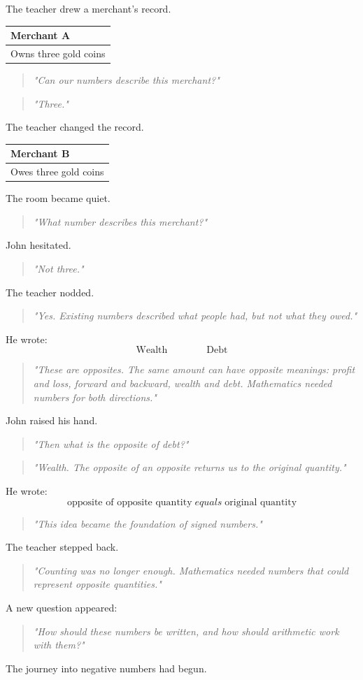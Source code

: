\documentclass[11pt]{article}
\begin{document}
The teacher drew a merchant's record.
\begin{center}
\begin{tabular}{|l|}
\hline
Merchant A\\
\hline
Owns three gold coins\\
\hline
\end{tabular}
\end{center}
\begin{quote}
\emph{"Can our numbers describe this merchant?"}
\end{quote}
\begin{quote}
\emph{"Three."}
\end{quote}
The teacher changed the record.
\begin{center}
\begin{tabular}{|l|}
\hline
Merchant B\\
\hline
Owes three gold coins\\
\hline
\end{tabular}
\end{center}

The room became quiet.
\begin{quote}
\emph{"What number describes this merchant?"}
\end{quote}
John hesitated.
\begin{quote}
\emph{"Not three."}
\end{quote}
The teacher nodded.
\begin{quote}
\emph{"Yes. Existing numbers described what people had, but not what they owed."}
\end{quote}
He wrote:
\[
\text{Wealth}\qquad\qquad\text{Debt}
\]
\begin{quote}
\emph{"These are opposites. The same amount can have opposite meanings: profit and loss, forward and backward, wealth and debt. Mathematics needed numbers for both directions."}
\end{quote}
John raised his hand.
\begin{quote}
\emph{"Then what is the opposite of debt?"}
\end{quote}

\begin{quote}
\emph{"Wealth. The opposite of an opposite returns us to the original quantity."}
\end{quote}
He wrote:
\[
\text{opposite of opposite quantity}\; equals \; \text{original quantity}
\]
\begin{quote}
\emph{"This idea became the foundation of signed numbers."}
\end{quote}
The teacher stepped back.
\begin{quote}
\emph{"Counting was no longer enough. Mathematics needed numbers that could represent opposite quantities."}
\end{quote}
A new question appeared:
\begin{quote}
\emph{"How should these numbers be written, and how should arithmetic work with them?"}
\end{quote}
The journey into negative numbers had begun.
\end{document}
